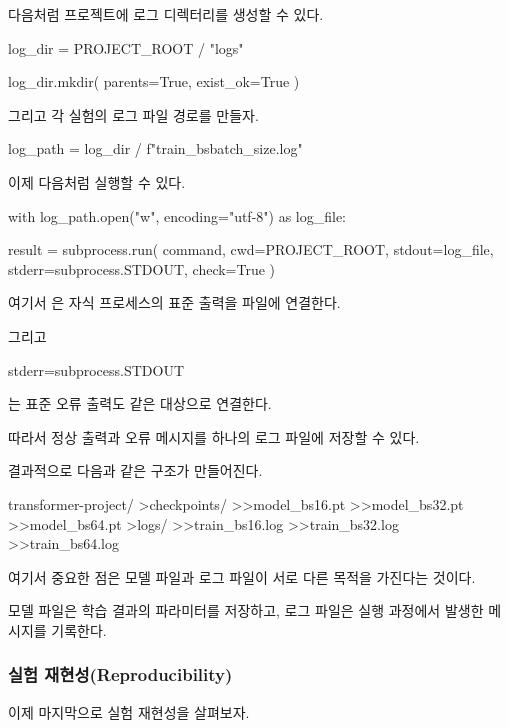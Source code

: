 다음처럼 프로젝트에 로그 디렉터리를 생성할 수 있다.

\begin{dhkcode}
log_dir = PROJECT_ROOT / "logs"

log_dir.mkdir(
    parents=True,
    exist_ok=True
)
\end{dhkcode}

그리고 각 실험의 로그 파일 경로를 만들자.

\begin{dhkcode}
log_path = log_dir / f"train_bs{batch_size}.log"
\end{dhkcode}

이제 다음처럼 실행할 수 있다.

\begin{dhkcode}
with log_path.open("w", encoding="utf-8") as log_file:

    result = subprocess.run(
        command,
        cwd=PROJECT_ROOT,
        stdout=log_file,
        stderr=subprocess.STDOUT,
        check=True
    )
\end{dhkcode}

여기서 은 자식 프로세스의 표준 출력을 파일에 연결한다.

그리고

\begin{dhkcode}
stderr=subprocess.STDOUT
\end{dhkcode}

는 표준 오류 출력도 같은 대상으로 연결한다.

따라서 정상 출력과 오류 메시지를 하나의 로그 파일에 저장할 수 있다.

결과적으로 다음과 같은 구조가 만들어진다.

\begin{dhkdir}[in=6]
transformer-project/
>checkpoints/
>>model_bs16.pt
>>model_bs32.pt
>>model_bs64.pt
>logs/
>>train_bs16.log
>>train_bs32.log
>>train_bs64.log
\end{dhkdir}

여기서 중요한 점은 모델 파일과 로그 파일이 서로 다른 목적을 가진다는 것이다.

모델 파일은 학습 결과의 파라미터를 저장하고, 로그 파일은 실행 과정에서 발생한 메시지를 기록한다.

\subsubsection{실험 재현성(Reproducibility)}

이제 마지막으로 실험 재현성을 살펴보자.

